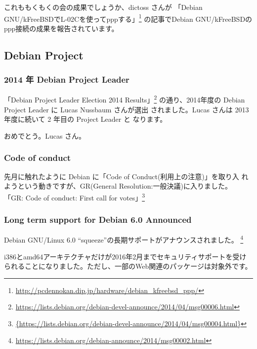 \documentclass[mingoth,a4paper]{jsarticle}
\begin{document}
これももくもくの会の成果でしょうか、dictoss さんが
「Debian GNU/kFreeBSDでL-02Cを使ってpppする」\footnote{\url{http://pcdennokan.dip.jp/hardware/debian_kfreebsd_ppp/}}
の記事でDebian GNU/kFreeBSDのppp接続の成果を報告されています。

\subsection{Debian Project}

\subsubsection{2014 年 Debian Project Leader}
「Debian Project Leader Election 2014 Results」\footnote{\url{https://lists.debian.org/debian-devel-announce/2014/04/msg00006.html}}
の通り、2014年度の Debian Project Leader に Lucas Nussbaum さんが選出
されました。Lucas さんは 2013 年度に続いて 2 年目の Project Leader と
なります。

おめでとう。Lucas さん。

\subsubsection{Code of conduct}
先月に触れたように Debian に「Code of Conduct(利用上の注意)」を取り入
れようという動きですが、GR(General Resolution:一般決議)に入りました。
「GR: Code of conduct: First call for votes」\footnote{\url{{https://lists.debian.org/debian-devel-announce/2014/04/msg00004.html}}}

\subsubsection{Long term support for Debian 6.0 Announced}

Debian GNU/Linux 6.0 ``squeeze''の長期サポートがアナウンスされました。
\footnote{\url{https://lists.debian.org/debian-announce/2014/msg00002.html}}

i386とamd64アーキテクチャだけが2016年2月までセキュリティサポートを受け
られることになりました。ただし、一部のWeb関連のパッケージは対象外です。

\end{document}

